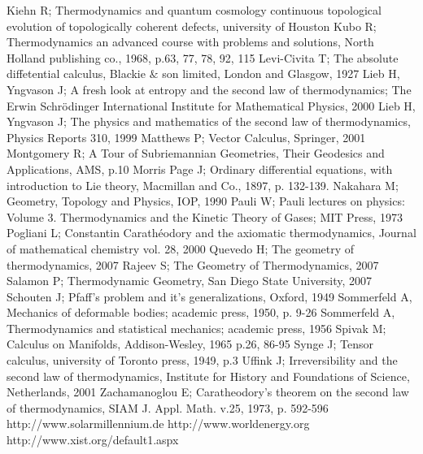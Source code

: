 \documentclass{article}
\theoremstyle{definition} \newtheorem{defi}{Definici\'on}
\theoremstyle{definition} \newtheorem{teo}{Teorema}
\theoremstyle{definition} \newtheorem{cor}{Corolario}
\begin{document}
\begin{thebibliography}{70}
 Kiehn R; Thermodynamics and quantum cosmology continuous topological evolution of topologically coherent defects, university of Houston
 Kubo R; Thermodynamics an advanced course with problems and solutions, North Holland publishing co., 1968, p.63, 77, 78, 92, 115
 Levi-Civita T; The absolute diffetential calculus, Blackie $\&$ son limited, London and Glasgow, 1927
 Lieb H, Yngvason J; A fresh look at entropy and the second law of thermodynamics; The Erwin Schr\"{o}dinger International Institute for Mathematical Physics, 2000 
 Lieb H, Yngvason J; The physics and mathematics of the second law of thermodynamics, Physics Reports 310, 1999
 Matthews P; Vector Calculus, Springer, 2001
 Montgomery R; A Tour of Subriemannian Geometries, Their Geodesics and Applications, AMS, p.10
 Morris Page J; Ordinary differential equations, with introduction to Lie theory, Macmillan and Co., 1897, p. 132-139.
 Nakahara M; Geometry, Topology and Physics, IOP, 1990
 Pauli W; Pauli lectures on physics: Volume 3. Thermodynamics and the Kinetic Theory of Gases; MIT Press, 1973
 Pogliani L; Constantin Carath\'eodory and the axiomatic thermodynamics, Journal of mathematical chemistry vol. 28, 2000
 Quevedo H; The geometry of thermodynamics, 2007
 Rajeev S; The Geometry of Thermodynamics, 2007
 Salamon P; Thermodynamic Geometry, San Diego State University, 2007
 Schouten J; Pfaff's problem and it's generalizations, Oxford, 1949
 Sommerfeld A, Mechanics of deformable bodies; academic press, 1950, p. 9-26 
 Sommerfeld A, Thermodynamics and statistical mechanics; academic press, 1956
 Spivak M; Calculus on Manifolds, Addison-Wesley, 1965 p.26, 86-95
 Synge J; Tensor calculus, university of Toronto press, 1949, p.3 
 Uffink J; Irreversibility and the second law of thermodynamics, Institute for History and Foundations of Science, Netherlands, 2001
 Zachamanoglou E; Caratheodory's theorem on the second law of thermodynamics, SIAM J. Appl. Math. v.25, 1973, p. 592-596
 http://www.solarmillennium.de
 http://www.worldenergy.org
 http://www.xist.org/default1.aspx
\end{thebibliography}
\end{document}
